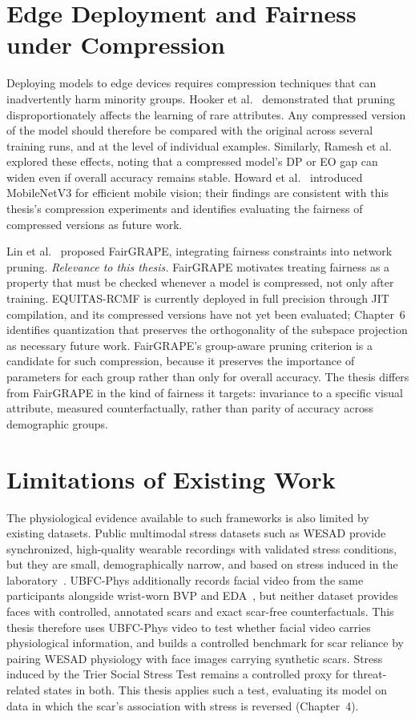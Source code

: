 \section{Edge Deployment and Fairness under Compression}

Deploying models to edge devices requires compression techniques that can inadvertently harm minority groups. Hooker et al.~\cite{hooker2019} demonstrated that pruning disproportionately affects the learning of rare attributes. Any compressed version of the model should therefore be compared with the original across several training runs, and at the level of individual examples. Similarly, Ramesh et al. explored these effects, noting that a compressed model's DP or EO gap can widen even if overall accuracy remains stable. Howard et al.~\cite{howard2019} introduced MobileNetV3 for efficient mobile vision; their findings are consistent with this thesis's compression experiments and identifies evaluating the fairness of compressed versions as future work.

Lin et al.~\cite{lin2022} proposed FairGRAPE, integrating fairness constraints into network pruning.
\textit{Relevance to this thesis.} FairGRAPE motivates treating fairness as a property that must be checked whenever a model is compressed, not only after training. EQUITAS-RCMF is currently deployed in full precision through JIT compilation, and its compressed versions have not yet been evaluated; Chapter~6 identifies quantization that preserves the orthogonality of the subspace projection as necessary future work. FairGRAPE's group-aware pruning criterion is a candidate for such compression, because it preserves the importance of parameters for each group rather than only for overall accuracy. The thesis differs from FairGRAPE in the kind of fairness it targets: invariance to a specific visual attribute, measured counterfactually, rather than parity of accuracy across demographic groups.

\section{Limitations of Existing Work}

The physiological evidence available to such frameworks is also limited by existing datasets. Public multimodal stress datasets such as WESAD provide synchronized, high-quality wearable recordings with validated stress conditions, but they are small, demographically narrow, and based on stress induced in the laboratory~\cite{schmidt2018}. UBFC-Phys additionally records facial video from the same participants alongside wrist-worn BVP and EDA~\cite{sabour2023}, but neither dataset provides faces with controlled, annotated scars and exact scar-free counterfactuals. This thesis therefore uses UBFC-Phys video to test whether facial video carries physiological information, and builds a controlled benchmark for scar reliance by pairing WESAD physiology with face images carrying synthetic scars. Stress induced by the Trier Social Stress Test remains a controlled proxy for threat-related states in both. This thesis applies such a test, evaluating its model on data in which the scar's association with stress is reversed (Chapter~4).

